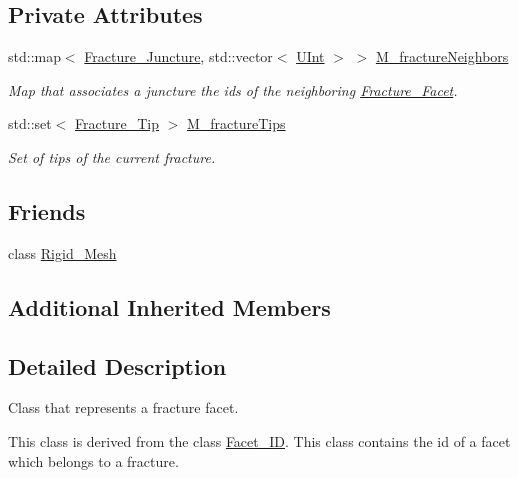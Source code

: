 \subsection*{Private Attributes}
\begin{DoxyCompactItemize}
\item 
std\+::map$<$ \hyperlink{classFVCode3D_1_1Rigid__Mesh_a7c7beee55763889ef7a4d0bc48392084}{Fracture\+\_\+\+Juncture}, std\+::vector$<$ \hyperlink{namespaceFVCode3D_a4bf7e328c75d0fd504050d040ebe9eda}{U\+Int} $>$ $>$ \hyperlink{classFVCode3D_1_1Rigid__Mesh_1_1Fracture__Facet_ac1812d6492dbf2b3a270cc8db789471f}{M\+\_\+fracture\+Neighbors}
\begin{DoxyCompactList}\small\item\em Map that associates a juncture the ids of the neighboring \hyperlink{classFVCode3D_1_1Rigid__Mesh_1_1Fracture__Facet}{Fracture\+\_\+\+Facet}. \end{DoxyCompactList}\item 
std\+::set$<$ \hyperlink{classFVCode3D_1_1Rigid__Mesh_a114241afca8d7f22e28397e6a59c931f}{Fracture\+\_\+\+Tip} $>$ \hyperlink{classFVCode3D_1_1Rigid__Mesh_1_1Fracture__Facet_a7bd9c81fb6dca96265060615307b14ad}{M\+\_\+fracture\+Tips}
\begin{DoxyCompactList}\small\item\em Set of tips of the current fracture. \end{DoxyCompactList}\end{DoxyCompactItemize}
\subsection*{Friends}
\begin{DoxyCompactItemize}
\item 
class \hyperlink{classFVCode3D_1_1Rigid__Mesh_1_1Fracture__Facet_a43983e56a64f3bc6fc936f03c4b170bb}{Rigid\+\_\+\+Mesh}
\end{DoxyCompactItemize}
\subsection*{Additional Inherited Members}


\subsection{Detailed Description}
Class that represents a fracture facet. 

This class is derived from the class \hyperlink{classFVCode3D_1_1Rigid__Mesh_1_1Facet__ID}{Facet\+\_\+\+ID}. This class contains the id of a facet which belongs to a fracture. 

